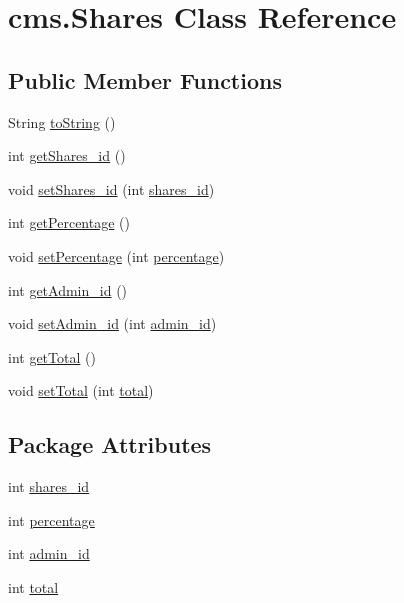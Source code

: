 \hypertarget{classcms_1_1_shares}{}\section{cms.\+Shares Class Reference}
\label{classcms_1_1_shares}
\subsection*{Public Member Functions}
\begin{DoxyCompactItemize}
\item 
String \mbox{\hyperlink{classcms_1_1_shares_a6b6665eacebf3aab93e80e972d160610}{to\+String}} ()
\item 
int \mbox{\hyperlink{classcms_1_1_shares_a2606dd07a0591e0ded437516a27c81b6}{get\+Shares\+\_\+id}} ()
\item 
void \mbox{\hyperlink{classcms_1_1_shares_a8af73b7871377976b993fec8d79b23d3}{set\+Shares\+\_\+id}} (int \mbox{\hyperlink{classcms_1_1_shares_a15e43f7e31f2c147893fc92c4a94037a}{shares\+\_\+id}})
\item 
int \mbox{\hyperlink{classcms_1_1_shares_af7f36074ebe66a289b66ad57cb96b0bf}{get\+Percentage}} ()
\item 
void \mbox{\hyperlink{classcms_1_1_shares_a8f1f69169cb7f4e6f3713d9b3e057d1c}{set\+Percentage}} (int \mbox{\hyperlink{classcms_1_1_shares_a7235d21d3198a5acbd0135d6486e6f51}{percentage}})
\item 
int \mbox{\hyperlink{classcms_1_1_shares_a544a337f6d85a1e91f719678bd050763}{get\+Admin\+\_\+id}} ()
\item 
void \mbox{\hyperlink{classcms_1_1_shares_a8f025b1fab555ab66ebfee36ffd7e918}{set\+Admin\+\_\+id}} (int \mbox{\hyperlink{classcms_1_1_shares_a04c23ccc0ceb9f01dad2e5cb65cbc7e6}{admin\+\_\+id}})
\item 
int \mbox{\hyperlink{classcms_1_1_shares_a7c570e186e607ad6e777d7882259e91f}{get\+Total}} ()
\item 
void \mbox{\hyperlink{classcms_1_1_shares_a4d5f794df6ae573de5497de193a81a1b}{set\+Total}} (int \mbox{\hyperlink{classcms_1_1_shares_ab40a204e3f87bf0f315888a9040a8681}{total}})
\end{DoxyCompactItemize}
\subsection*{Package Attributes}
\begin{DoxyCompactItemize}
\item 
int \mbox{\hyperlink{classcms_1_1_shares_a15e43f7e31f2c147893fc92c4a94037a}{shares\+\_\+id}}
\item 
int \mbox{\hyperlink{classcms_1_1_shares_a7235d21d3198a5acbd0135d6486e6f51}{percentage}}
\item 
int \mbox{\hyperlink{classcms_1_1_shares_a04c23ccc0ceb9f01dad2e5cb65cbc7e6}{admin\+\_\+id}}
\item 
int \mbox{\hyperlink{classcms_1_1_shares_ab40a204e3f87bf0f315888a9040a8681}{total}}
\end{DoxyCompactItemize}


